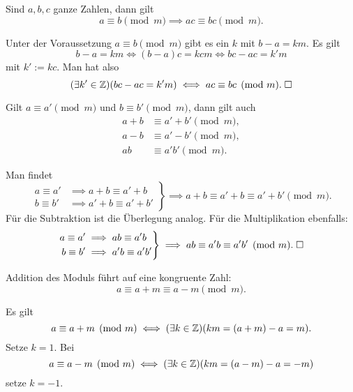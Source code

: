 \begin{Satz}
Sind $a,b,c$ ganze Zahlen, dann gilt
\[a\equiv b\pmod{m} \implies ac\equiv bc\pmod{m}.\]
\end{Satz}
Unter der Voraussetzung $a\equiv b\pmod{m}$ gibt es ein
$k$ mit $b-a=km$. Es gilt
\[b-a=km\iff (b-a)c=kcm \iff bc-ac=k'm\]
mit $k':=kc$. Man hat also
\[(\exists k'\in\mathbb Z)(bc-ac=k'm)\iff ac\equiv bc\pmod{m}.\;\Box\]

\begin{Satz}
Gilt $a\equiv a'\pmod{m}$ und
$b\equiv b'\pmod{m}$, dann gilt auch
\begin{align*}
a+b&\equiv a'+b'\pmod{m},\\
a-b&\equiv a'-b'\pmod{m},\\
ab&\equiv a'b'\pmod{m}.
\end{align*}
\end{Satz}
 Man findet
\begin{equation}
\left.\begin{aligned}
a\equiv a'&\implies a+b\equiv a'+b\\
b\equiv b'&\implies a'+b\equiv a'+b'
\end{aligned}\right\}
\implies a+b\equiv a'+b\equiv a'+b'\pmod{m}.
\end{equation}
Für die Subtraktion ist die Überlegung analog. Für die Multiplikation
ebenfalls:%
\begin{equation}
\left.\begin{aligned}
a\equiv a'&\implies ab\equiv a'b\\
b\equiv b'&\implies a'b\equiv a'b'
\end{aligned}\right\}
\implies ab\equiv a'b\equiv a'b'\pmod{m}.\;\Box
\end{equation}

\begin{Satz}
Addition des Moduls führt auf eine kongruente Zahl:%
\[a\equiv a+m\equiv a-m\pmod{m}.\]
\end{Satz}
Es gilt
\[a\equiv a+m\pmod{m}\iff (\exists k\in\mathbb Z)(km=(a+m)-a=m).\]
Setze $k=1$. Bei
\[a\equiv a-m\pmod{m}\iff (\exists k\in\mathbb Z)(km=(a-m)-a=-m)\]
setze $k=-1$.\;\qedsymbol
